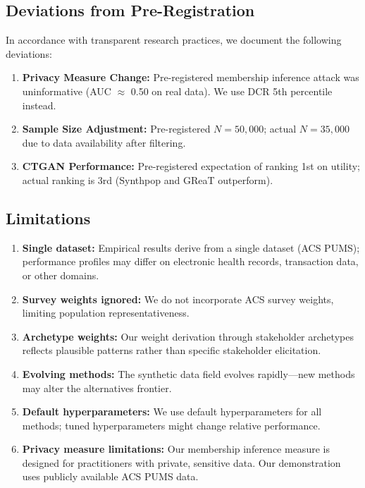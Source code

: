 \documentclass[12pt,a4paper]{article}
\begin{document}
\subsection{Deviations from Pre-Registration}

In accordance with transparent research practices, we document the following deviations:

\begin{enumerate}
    \item \textbf{Privacy Measure Change:} Pre-registered membership inference attack was uninformative (AUC $\approx$ 0.50 on real data). We use DCR 5th percentile instead.
    
    \item \textbf{Sample Size Adjustment:} Pre-registered $N=50{,}000$; actual $N=35{,}000$ due to data availability after filtering.
    
    \item \textbf{CTGAN Performance:} Pre-registered expectation of ranking 1st on utility; actual ranking is 3rd (Synthpop and GReaT outperform).
\end{enumerate}

\subsection{Limitations}

\begin{enumerate}
    \item \textbf{Single dataset:} Empirical results derive from a single dataset (ACS PUMS); performance profiles may differ on electronic health records, transaction data, or other domains.
    
    \item \textbf{Survey weights ignored:} We do not incorporate ACS survey weights, limiting population representativeness.
    
    \item \textbf{Archetype weights:} Our weight derivation through stakeholder archetypes reflects plausible patterns rather than specific stakeholder elicitation.
    
    \item \textbf{Evolving methods:} The synthetic data field evolves rapidly---new methods may alter the alternatives frontier.
    
    \item \textbf{Default hyperparameters:} We use default hyperparameters for all methods; tuned hyperparameters might change relative performance.
    
    \item \textbf{Privacy measure limitations:} Our membership inference measure is designed for practitioners with private, sensitive data. Our demonstration uses publicly available ACS PUMS data.
\end{enumerate}
\end{document}
